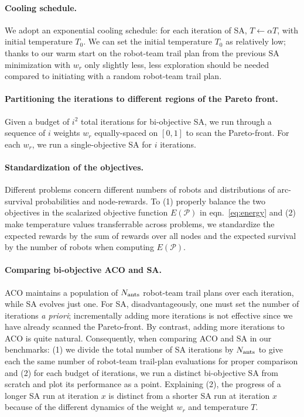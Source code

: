 \documentclass[fleqn,10pt,lineno]{wlpeerj}
\begin{document}
\paragraph{Cooling schedule.}
We adopt an exponential cooling schedule: for each iteration of SA, $T \leftarrow \alpha T$, with initial temperature $T_0$. We can set the initial temperature $T_0$ as relatively low; thanks to our warm start on the robot-team trail plan from the previous SA minimization with $w_r$ only slightly less, less exploration should be needed compared to initiating with a random robot-team trail plan.



\paragraph{Partitioning the iterations to different regions of the Pareto front.}
Given a budget of $i^2$ total iterations for bi-objective SA, we run through a sequence of $i$ weights $w_r$ equally-spaced on $[0, 1]$ to scan the Pareto-front. For each $w_r$, we run a single-objective SA for $i$ iterations. 

\paragraph{Standardization of the objectives.}
Different problems concern different numbers of robots and distributions of arc-survival probabilities and node-rewards.
To (1) properly balance the two objectives in the scalarized objective function $E(\mathcal{P})$ in eqn.~\ref{eq:energy} and (2) make temperature values transferrable across problems, we standardize the expected rewards by the sum of rewards over all nodes and the expected survival by the number of robots when computing $E(\mathcal{P})$.

\paragraph{Comparing bi-objective ACO and SA.}
ACO maintains a population of $N_{\rm ants}$ robot-team trail plans over each iteration, while SA evolves just one.
For SA, disadvantageously, one must set the number of iterations \emph{a priori}; incrementally adding more iterations is not effective since we have already scanned the Pareto-front. By contrast, adding more iterations to ACO is quite natural.
Consequently, when comparing ACO and SA in our benchmarks: 
(1) we divide the total number of SA iterations by $N_{\rm ants}$ to give each the same number of robot-team trail-plan evaluations for proper comparison and 
(2) for each budget of iterations, we run a distinct bi-objective SA from scratch and plot its performance as a point. Explaining (2), the progress of a longer SA run at iteration $x$ is distinct from a shorter SA run at iteration $x$ because of the different dynamics of the weight $w_r$ and temperature $T$.
\end{document}
